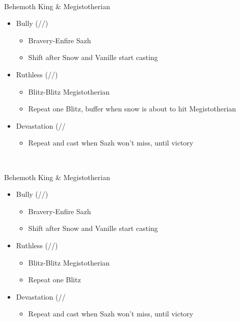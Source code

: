 \begin{paracol}{2}
	\renewcommand{\first}{[1] Tireless Charge (\com/\med/\com)}
	\renewcommand{\second}{[2] Ruthless (\com/\sab/\rav)}
	\renewcommand{\third}{[3] }
	\renewcommand{\fourth}{[4] Devastation (\com/\sab/\com}
	\renewcommand{\fifth}{[5] Bully (\syn/\sab/\rav)}
	\renewcommand{\sixth}{[6] Relentless Assault (\com/\rav/\com)}
	\switchcolumn*
	\
	\begin{battle}{Behemoth King \& Megistotherian}
		\begin{itemize}
			\item \fifth
			      \begin{itemize}
				      \item Bravery-Enfire Sazh
				      \item Shift after Snow and Vanille start casting
			      \end{itemize}
			\item \second
			      \begin{itemize}
				      \item Blitz-Blitz Megistotherian
				      \item Repeat one Blitz, buffer when snow is about to hit Megistotherian
			      \end{itemize}
			\item \fourth
			      \begin{itemize}
				      \item Repeat and cast when Sazh won't miss, until victory
			      \end{itemize}
		\end{itemize}
	\end{battle}
	\switchcolumn
	\
	\begin{battle}{Behemoth King \& Megistotherian}
		\begin{itemize}
			\item \fifth
			      \begin{itemize}
				      \item Bravery-Enfire Sazh
				      \item Shift after Snow and Vanille start casting
			      \end{itemize}
			\item \second
			      \begin{itemize}
				      \item Blitz-Blitz Megistotherian
				      \item Repeat one Blitz
			      \end{itemize}
			\item \fourth
			      \begin{itemize}
				      \item Repeat and cast when Sazh won't miss, until victory
			      \end{itemize}
		\end{itemize}
		\itemdrop{0.3}{Aegisol}
	\end{battle}
	\switchcolumn*


\end{paracol}
